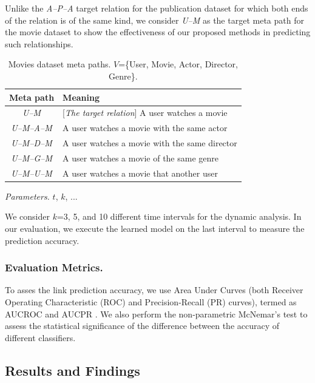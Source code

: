Unlike the \textit{A--P--A} target relation for the publication dataset for which both ends of the relation is of the same kind, we consider \textit{U--M} as the target meta path for the movie dataset to show the effectiveness of our proposed methods in predicting such relationships.

\begin{table}[h]
\centering
\caption{Movies dataset meta paths. $V$=\{User, Movie, Actor, Director, Genre\}.}
\label{table_movies}\scriptsize
\begin{tabular}{|c|l|} \hline
\textbf{Meta path} & \textbf{Meaning} \\ \hline
\textit{U--M} & [\textit{The target relation}] A user watches a movie \\ \hline

\textit{U--M--A--M} & A user watches a movie with the same actor \\ \hline
\textit{U--M--D--M} & A user watches a movie with the same director \\ \hline
\textit{U--M--G--M} & A user watches a movie of the same genre \\ \hline
\textit{U--M--U--M} & A user watches a movie that another user  \\ \hline

\end{tabular}
\end{table}


\textit{Parameters.} $t$, $k$, ...

We consider $k$=3, 5, and 10 different time intervals for the dynamic analysis. In our evaluation, we execute the learned model on the last interval to measure the prediction accuracy.

\subsubsection{Evaluation Metrics.} 

To asses the link prediction accuracy, we use Area Under Curves (both Receiver Operating Characteristic (ROC) and Precision-Recall (PR) curves), termed as AUCROC and AUCPR \cite{davis2006relationship}. We also perform the non-parametric McNemar's test \cite{mcnemar1947note} to assess the statistical significance of the difference between the accuracy of different classifiers.


\subsection{Results and Findings}


